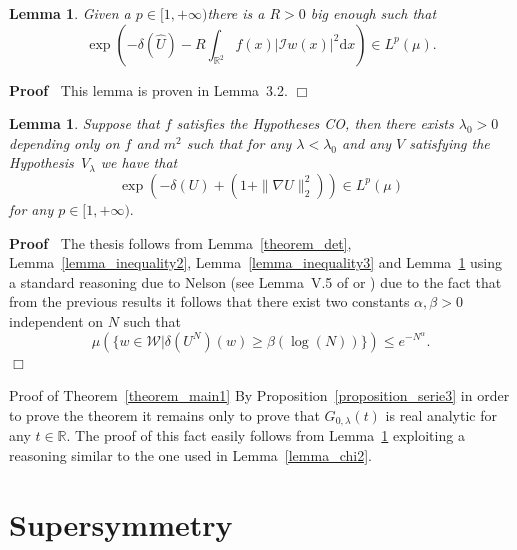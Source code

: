\documentclass[a4paper,10pt]{article}
\newcommand{\mathd}{\mathrm{d}}
\newenvironment{proof}{\noindent\textbf{Proof\ }}{\hspace*{\fill}$\Box$\medskip}
\newenvironment{proof*}[1]{\noindent\textbf{#1\ }}{\hspace*{\fill}$\Box$\medskip}
\newtheorem{lemma}[theorem]{Lemma}
\begin{document}
\begin{lemma}
  \label{lemma_inequality4}Given a $p \in [1, + \infty) $there is a $R > 0$
  big enough such that
  \[ \exp \left( - \delta (\hat{U}) - R \int_{\mathbb{R}^2} f (x) |
     \mathcal{I}w (x) |^2 \mathd x \right) \in L^p (\mu) . \]
\end{lemma}

\begin{proof}
  This lemma is proven in {\cite{Klein1984}} Lemma~3.2. 
\end{proof}

\begin{lemma}
  \label{lemma_Lp}Suppose that $f$ satisfies the Hypotheses CO, then there
  exists $\lambda_0 > 0$ depending only on $f$ and $m^2$ such that for any
  $\lambda < \lambda_0$ and any $V$ satisfying the Hypothesis~$V_{\lambda}$ we
  have that
  \[ \exp (- \delta (U) + (1 + \| \nabla U \|^2_2)) \in L^p (\mu) \]
  for any $p \in [1, + \infty) .$
\end{lemma}

\begin{proof}
  The thesis follows from Lemma~\ref{theorem_det},
  Lemma~\ref{lemma_inequality2}, Lemma~\ref{lemma_inequality3} and
  Lemma~\ref{lemma_inequality4} using a standard reasoning due to Nelson (see
  Lemma~V.5 of {\cite{Simon1974}} or {\cite{Glimm1987}}) due to the fact that
  from the previous results it follows that there exist two constants $\alpha,
  \beta > 0$ independent on $N$ such that
  \[ \mu (\{ w \in \mathcal{W}| \delta (U^N) (w) \geqslant \beta (\log (N))
     \}) \leqslant e^{- N^{\alpha}} . \]
\end{proof}

\begin{proof*}{Proof of Theorem~\ref{theorem_main1}}
  By Proposition~\ref{proposition_serie3} in order to prove the theorem it
  remains only to prove that $G_{0, \lambda} (t)$ is real analytic for any $t
  \in \mathbb{R}$. The proof of this fact easily follows from
  Lemma~\ref{lemma_Lp} exploiting a reasoning similar to the one used in
  Lemma~\ref{lemma_chi2}.
\end{proof*}

\section{Supersymmetry}\label{section:supersymmetry}
\end{document}
